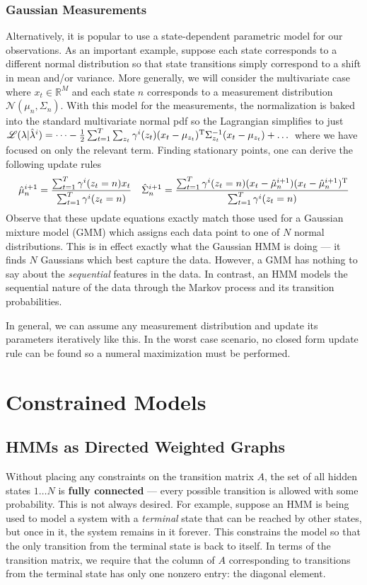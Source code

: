 \documentclass[onecolumn]{gwclass}
\newcommand{\R}{\mathbb{R}}
\begin{document}
	\subsubsection{Gaussian Measurements}
	Alternatively, it is popular to use a state-dependent parametric model for our observations. As an important example, suppose each state corresponds to a different normal distribution so that state transitions simply correspond to a shift in mean and/or variance. More generally, we will consider the multivariate case where $x_t\in\R^M$ and each state $n$ corresponds to a measurement distribution $\mathcal{N}(\mu_n,\Sigma_n)$. With this model for the measurements, the normalization is baked into the standard multivariate normal pdf so the Lagrangian simplifies to just $ \mathscr{L}(\lambda|\hat\lambda^i) = \dots - \frac{1}{2}\sum_{t=1}^T \sum_{z_t} \gamma^i(z_t) (x_t- \mu_{z_t})^{\text{\normalfont{T}}}\Sigma_{z_t}^{-1}(x_t- \mu_{z_t})+ \dots  $ where we have focused on only the relevant term.
	Finding stationary points, one can derive the following  update rules
	\begin{align*}
		\hat\mu^{i+1}_n = \frac{\sum_{t=1}^T	 \gamma^i(z_t=n)x_t}{\sum_{t=1}^T \gamma^i(z_t=n)}&&
		\hat\Sigma_n^{i+1} = \frac{\sum_{t=1}^T\gamma^i(z_t=n)(x_t - \hat\mu_n^{i+1})(x_t - \hat\mu_n^{i+1})^{\text{\normalfont{T}}}}{\sum_{t=1}^T \gamma^i(z_t=n)}
	\end{align*}
	Observe that these update equations exactly match those used for a Gaussian mixture model (GMM) which assigns each data point to one of $N$ normal distributions. This is in effect exactly what the Gaussian HMM is doing --- it finds $N$ Gaussians which best capture the data. However, a GMM has nothing to say about the \emph{sequential} features in the data. In contrast, an HMM models the sequential nature of the data through the Markov process and its transition probabilities. 
	
	In general, we can assume any measurement distribution and update its parameters iteratively like this. In the worst case scenario, no closed form update rule can be found so a numeral maximization must be performed. 
	
	
	\section{Constrained Models}
	\subsection{HMMs as Directed Weighted Graphs}
	Without placing any constraints on the transition matrix $A$, the set of all hidden states $1\dots N$ is \textbf{fully connected} --- every possible transition is allowed with some probability. This is not always desired. For example, suppose an HMM is being used to model a system with a \emph{terminal} state that can be reached by other states, but once in it, the system remains in it forever. This constrains the model so that the only transition from the terminal state is back to itself. In terms of the transition matrix, we require that the column of $A$ corresponding to transitions from the terminal state has only one nonzero entry: the diagonal element.
	
\end{document}
